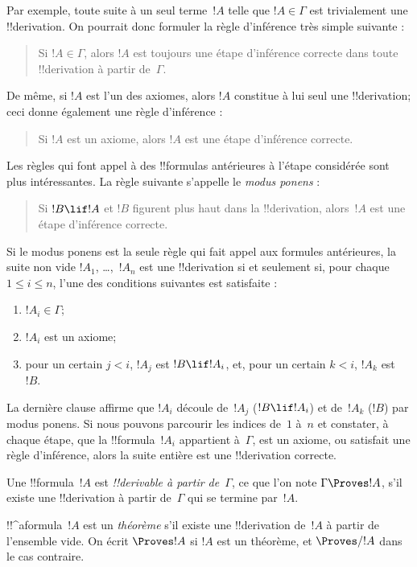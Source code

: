 \documentclass[../../../include/open-logic-section]{subfiles}
\begin{document}
Par exemple, toute suite à un seul terme~$!A$ telle que
$!A \in \Gamma$ est trivialement une !!{derivation}. On pourrait donc
formuler la règle d'inférence très simple suivante :
\begin{quote}
  Si $!A \in \Gamma$, alors $!A$ est toujours une étape d'inférence
  correcte dans toute !!{derivation} à partir de~$\Gamma$.
\end{quote}
De même, si $!A$ est l'un des axiomes, alors $!A$ constitue à lui seul
une !!{derivation}; ceci donne également une règle d'inférence :
\begin{quote}
  Si $!A$ est un axiome, alors $!A$ est une étape d'inférence correcte.
\end{quote}
Les règles qui font appel à des !!{formula}s antérieures à l'étape
considérée sont plus intéressantes. La règle suivante s'appelle le
\emph{modus ponens} :
\begin{quote}
  Si $!B \lif !A$ et $!B$ figurent plus haut dans la !!{derivation},
  alors~$!A$ est une étape d'inférence correcte.
\end{quote}
Si le modus ponens est la seule règle qui fait appel aux formules
antérieures, la suite non vide $!A_1$, \dots,~$!A_n$ est une
!!{derivation} si et seulement si, pour chaque $1 \le i \le n$,
l'une des conditions suivantes est satisfaite :
\begin{enumerate}
\item $!A_i \in \Gamma$;
\item $!A_i$ est un axiome;
\item pour un certain $j < i$, $!A_j$ est $!B \lif !A_i$, et, pour un
  certain $k < i$, $!A_k$ est~$!B$.
\end{enumerate}
La dernière clause affirme que $!A_i$ découle de~$!A_j$
($!B \lif !A_i$) et de~$!A_k$ ($!B$) par modus ponens. Si nous pouvons
parcourir les indices de~$1$ à~$n$ et constater, à chaque étape, que
la !!{formula}~$!A_i$ appartient à~$\Gamma$, est un axiome, ou satisfait
une règle d'inférence, alors la suite entière est une !!{derivation}
correcte.

\begin{defn}[!!^{derivability}]
Une !!{formula}~$!A$ est \emph{!!{derivable} à partir de~$\Gamma$}, ce
que l'on note $\Gamma \Proves !A$, s'il existe une !!{derivation} à
partir de~$\Gamma$ qui se termine par~$!A$.
\end{defn}

\begin{defn}[Théorèmes]
!!^a{formula}~$!A$ est un \emph{théorème} s'il existe une
!!{derivation} de~$!A$ à partir de l'ensemble vide. On écrit
$\Proves !A$ si $!A$ est un théorème, et $\Proves/ !A$ dans le cas
contraire.
\end{defn}
\end{document}
